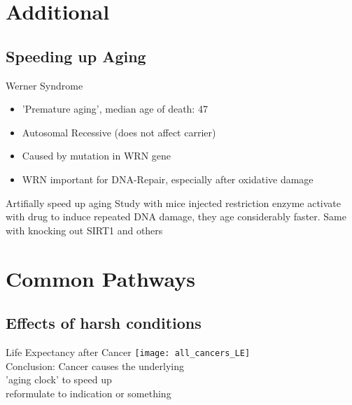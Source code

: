 \appendix
\backupbegin

\section{Additional}
\subsection{Speeding up Aging}

\begin{frame}[c]{Werner Syndrome}
    \large
    \begin{itemize}[<+(1)->]
        \item 'Premature aging', median age of death: 47
        \item Autosomal Recessive (does not affect carrier)
        \item Caused by mutation in WRN gene
        \item WRN important for DNA-Repair, especially after oxidative damage \cite{szekely2005werner}
    \end{itemize}

\end{frame}


\begin{frame}[c]{Artifially speed up aging}
    \large
    Study with mice injected restriction enzyme activate with drug to induce
    repeated DNA damage, they age considerably faster. Same with knocking out SIRT1 and others
\end{frame}

\section{Common Pathways}

\subsection{Effects of harsh conditions}

\begin{frame}[c]{Life Expectancy after Cancer}
    \large
    \texttt{[image: all\_cancers\_LE]} \\
    \cite{botta2019changes}
    \newline
    \newline
    \pause
    Conclusion: Cancer causes the underlying \\ 'aging clock' to speed up \\
    reformulate to indication or something
\end{frame}

